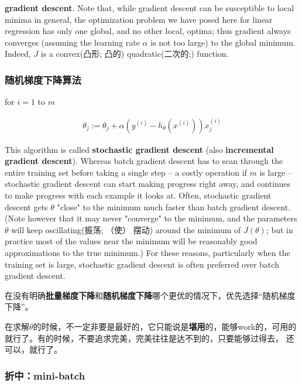 \documentclass[UTF8]{ctexbook}
\begin{document}
\textbf{gradient descent}. Note that, while gradient descent can be susceptible to local minima in general, the optimization problem we have posed here for linear regression has only one global, and no other local, optima; thus gradient always converges (assuming the learning rate $\alpha$ is not too large) to the global minimum. Indeed, $J$ is a convex(凸形; 凸的) quadratic(二次的;) function.

 \subsubsection{随机梯度下降算法}

 for $i=1$ to $m$

 \begin{equation}
\begin{aligned}
\theta_{j} := \theta_{j}+\alpha  (y^{(i)}-h_{\theta}(x^{(i)}))x^{(i)}_{j}
\end{aligned}
\end{equation}

This algorithm is called \textbf{stochastic gradient descent} (also \textbf{incremental gradient descent}).  Whereas batch gradient descent has to scan through the entire training set before taking a single step -- a costly operation if $m$ is large -- stochastic gradient descent can start making progress right away, and continues to make progress with each example it looks at. Often, stochastic gradient descent gets $\theta$ "close" to the minimum much faster than batch gradient descent. (Note however that it may never "converge" to the minimum, and the parameters $\theta$ will keep oscillating(振荡; （使） 摆动) around the minimum of $J(\theta)$; but in practice most of the values near the minimum will be reasonably good approximations to the true minimum.) For these reasons, particularly when the training set is large, stochastic gradient descent is often preferred over batch gradient descent.

在没有明确\textbf{批量梯度下降}和\textbf{随机梯度下降}哪个更优的情况下，优先选择“随机梯度下降”。

在求解$\theta$的时候，不一定非要是最好的，它只能说是\textbf{堪用}的，能够work的，可用的就行了。有的时候，不要追求完美，完美往往是达不到的，只要能够过得去， 还可以，就行了。

\subsubsection{折中：mini-batch}
\end{document}
